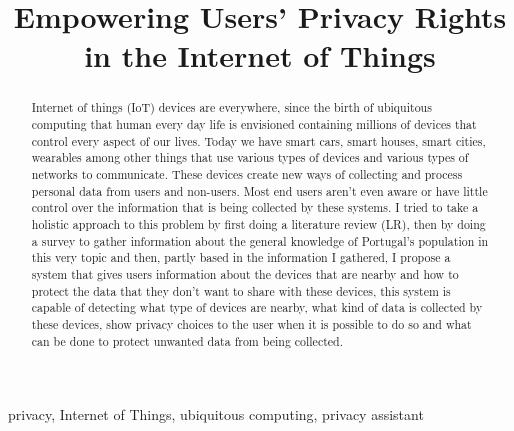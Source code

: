 \documentclass[conference]{IEEEtran}
\begin{document}
\title{Empowering Users' Privacy Rights in the Internet of Things\\
}

\author{
}

\maketitle

\begin{abstract}
Internet of things (IoT) devices are everywhere, since the birth of ubiquitous
computing that human every day life is envisioned containing millions of devices
that control every aspect of our lives. Today we have smart cars, smart houses,
smart cities, wearables among other things that use various types of devices
and various types of networks to communicate. These devices create new ways
of collecting and process personal data from users and non-users.
Most end users aren't even aware or have little control over the information that
is being collected by these systems. I tried to take a holistic approach to this
problem by first doing a literature review (LR), then by doing a survey to gather
information about the general knowledge of Portugal's population in this
very topic and then, partly based in the information I gathered, I propose
a system that gives users information about the devices that are nearby
and how to protect the data that they don't want to share with these devices,
this system is capable of detecting what type of devices are nearby,
what kind of data is collected by these devices, show privacy choices
to the user when it is possible to do so and what can be done to protect
unwanted data from being collected.
\end{abstract}

\begin{IEEEkeywords}
privacy, Internet of Things, ubiquitous computing, privacy assistant
\end{IEEEkeywords}
\end{document}
